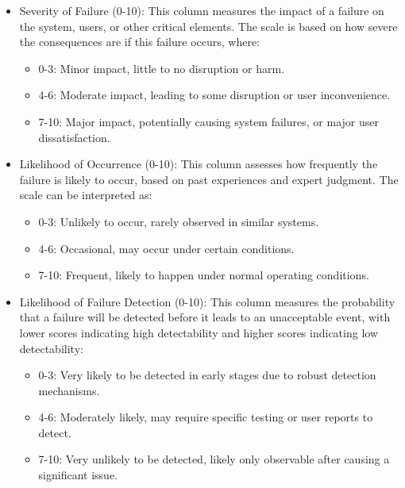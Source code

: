 \documentclass{article}
\begin{document}
\begin{itemize}

\item Severity of Failure (0-10): This column measures the impact of a failure on the system, users, or other critical elements. The scale is based on how severe the consequences are if this failure occurs, where:
\begin{itemize}
    \item 0-3: Minor impact, little to no disruption or harm.
    \item 4-6: Moderate impact, leading to some disruption or user inconvenience.
    \item 7-10: Major impact, potentially causing system failures, or major user dissatisfaction.
\end{itemize}

\item Likelihood of Occurrence (0-10): This column assesses how frequently the failure is likely to occur, based on past experiences and expert judgment. The scale can be interpreted as:
\begin{itemize}
    \item 0-3: Unlikely to occur, rarely observed in similar systems.
	\item 4-6: Occasional, may occur under certain conditions.
    \item 7-10: Frequent, likely to happen under normal operating conditions.
\end{itemize}

\item Likelihood of Failure Detection (0-10): This column measures the probability that a failure will be detected before it leads to an unacceptable event, with lower scores indicating high detectability and higher scores indicating low detectability:
\begin{itemize}
    \item 0-3: Very likely to be detected in early stages due to robust detection mechanisms.
	\item 4-6: Moderately likely, may require specific testing or user reports to detect.
    \item 7-10: Very unlikely to be detected, likely only observable after causing a significant issue.
\end{itemize}

\end{itemize}
\end{document}
